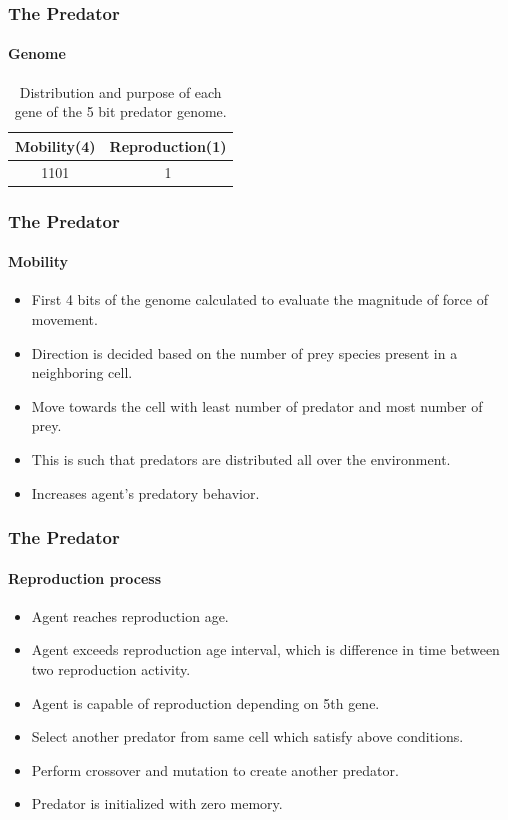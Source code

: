 \frame
{
	\frametitle{The Predator}
	\framesubtitle{Genome}

	\begin{table}
	\centering
	\begin{scriptsize}
	\begin{spacing}{1.5}
	\begin{tabular}{|c|c|}
		\hline
			\textbf{Mobility(4)} & \textbf{Reproduction(1)} \\ \hline
					 1101					   &					1						 		\\ \hline
	\end{tabular}
	\end{spacing}
	\end{scriptsize}
	\caption{Distribution and purpose of each gene of the 5 bit predator genome.}
	\label{tab:predator-genome}
	\end{table}
}

\frame
{
	\frametitle{The Predator}
	\framesubtitle{Mobility}
	
	\begin{itemize}
		\item First 4 bits of the genome calculated to evaluate the magnitude of force of movement.
		\item Direction is decided based on the number of prey species present in a neighboring cell.
		\item Move towards the cell with least number of predator and most number of prey.
		\item This is such that predators are distributed all over the environment.
		\item Increases agent's predatory behavior.
	\end{itemize}
}

\frame
{
	\frametitle{The Predator}
	\framesubtitle{Reproduction process}
	
	\begin{itemize}
		\item Agent reaches reproduction age.
		\item Agent exceeds reproduction age interval, which is difference in time between two reproduction activity.
		\item Agent is capable of reproduction depending on 5th gene.
		\item Select another predator from same cell which satisfy above conditions.
		\item Perform crossover and mutation to create another predator.
		\item Predator is initialized with zero memory.
	\end{itemize}
}

